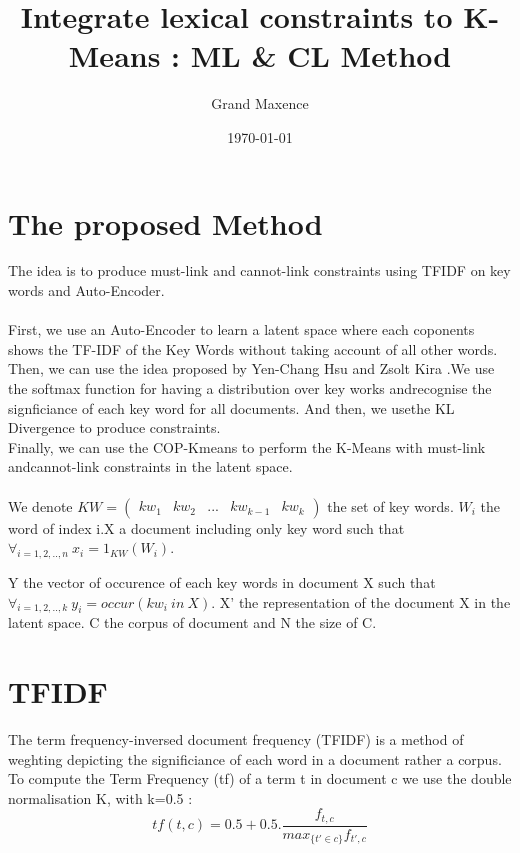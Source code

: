 \documentclass{article}
\title{Integrate lexical constraints to K-Means : ML \& CL Method}
\author{Grand Maxence}
\date{\today}
\begin{document}
\maketitle
\justify

\section{The proposed Method}

The idea is to produce must-link and cannot-link constraints using
TFIDF on key words and Auto-Encoder.\\ \\
First, we use an Auto-Encoder to learn a latent space where each
coponents shows the TF-IDF of the Key Words without taking account of
all other words.\\Then, we can use the idea proposed by Yen-Chang Hsu
and Zsolt Kira \cite{2015arXiv151106321H}.We use the softmax function
for having a distribution over key works andrecognise the signficiance
of each key word for all documents. And then, we usethe KL Divergence
to produce constraints.\\Finally, we can use the COP-Kmeans to perform
the K-Means with must-link andcannot-link constraints in the latent
space\cite{Wagstaff:2001:CKC:645530.655669}\cite{2016arXiv161004794Y}.
\\ \\
We denote $KW = \begin{pmatrix} kw_1 & kw_2 & ... & kw_{k-1} & kw_{k}
\end {pmatrix}$
the set of key words. $W_i$ the word of index i.X a document including
only key word such that $\forall_{i = 1,2,..,n}~x_i = 1_{KW}(W_i)$.

Y the vector of occurence of each key words in document X such that
$\forall_{i=1, 2, .., k}~y_i = occur(kw_i~in~X)$. X' the representation of
the document X in the latent space. C the corpus of document and N the
size of C.

\section{TFIDF}

The term frequency-inversed document frequency (TFIDF) is a method of
weghting depicting the significiance of each word in a document rather
a corpus.
\\
To compute the Term Frequency (tf) of a term t in document c we use
the double normalisation K, with k=0.5 :  
\begin{equation}\label{eq:tf}
  tf(t, c) = 0.5 + 0.5.\frac{f_{t,c}}{max_{\{t' \in c \}}f_{t',c}}
\end{equation}
\end{document}
